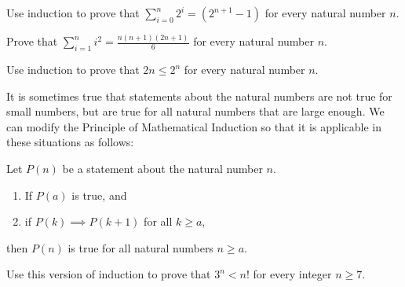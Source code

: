 \begin{exercise}
Use induction to prove that $\sum\limits_{i=0}^n 2^i=(2^{n+1}-1)$ for every natural number $n$.
\end{exercise}

\begin{exercise}
Prove that $\sum\limits_{i=1}^n i^2=\displaystyle\frac{n(n+1)(2n+1)}6$ for every natural number $n$.
\end{exercise}

\begin{exercise}\label{exer:induct}
Use induction to prove that $2n\leq 2^n$ for every natural number $n$.
\end{exercise}

\begin{exercise}
It is sometimes true that statements about the natural numbers are not true for small numbers, but are true for all natural numbers that are large enough. We can modify the Principle of Mathematical Induction so that it is applicable in these situations as follows:

Let $P(n)$ be a statement about the natural number $n$.
\begin{enumerate}
\item If $P(a)$ is true, and
\item if $P(k)\implies P(k+1)$ for all $k\geq a$,
\end{enumerate}
then $P(n)$ is true for all natural numbers $n\geq a$.

\smallbreak\noindent
Use this version of induction to prove that $3^n<n!$ for every integer $n\geq 7$. 
\end{exercise}

\clearpage
